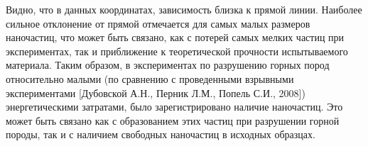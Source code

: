 Видно, что в данных координатах, зависимость близка к прямой линии. Наиболее сильное отклонение от прямой отмечается для самых малых размеров наночастиц, что может быть связано, как с потерей самых мелких частиц при экспериментах, так и приближение к теоретической прочности испытываемого материала.
Таким образом, в экспериментах по разрушению горных пород относительно малыми (по сравнению с проведенными взрывными экспериментами [Дубовской А.Н., Перник Л.М., Попель С.И., 2008]) энергетическими затратами, было зарегистрировано наличие наночастиц. Это может быть связано как с образованием этих частиц при разрушении горной породы, так и с наличием свободных наночастиц в исходных образцах.






\clearpage